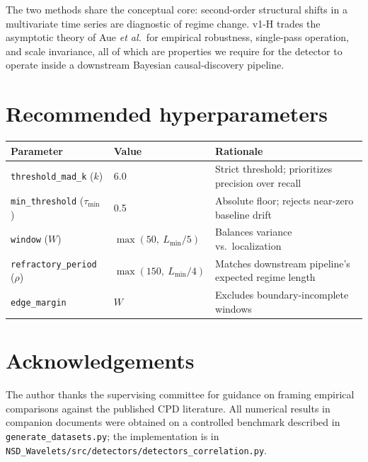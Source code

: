 \documentclass[11pt,a4paper]{article}
\begin{document}
The two methods share the conceptual core: second-order structural shifts
in a multivariate time series are diagnostic of regime change. v1-H trades
the asymptotic theory of Aue \emph{et al.}\ for empirical robustness, single-pass
operation, and scale invariance, all of which are properties we require
for the detector to operate inside a downstream Bayesian causal-discovery
pipeline.

\section{Recommended hyperparameters}

\begin{center}
\small
\begin{tabular}{lll}
\toprule
\textbf{Parameter} & \textbf{Value} & \textbf{Rationale} \\
\midrule
\texttt{threshold\_mad\_k} ($k$) & 6.0 & Strict threshold; prioritizes precision over recall \\
\texttt{min\_threshold} ($\tau_{\min}$) & 0.5 & Absolute floor; rejects near-zero baseline drift \\
\texttt{window} ($W$) & $\max(50,\ L_{\min}/5)$ & Balances variance vs.\ localization \\
\texttt{refractory\_period} ($\rho$) & $\max(150,\ L_{\min}/4)$ & Matches downstream pipeline's expected regime length \\
\texttt{edge\_margin} & $W$ & Excludes boundary-incomplete windows \\
\bottomrule
\end{tabular}
\end{center}

\section*{Acknowledgements}

The author thanks the supervising committee for guidance on framing
empirical comparisons against the published CPD literature. All numerical
results in companion documents were obtained on a controlled benchmark
described in \texttt{generate\_datasets.py}; the implementation is
in \texttt{NSD\_Wavelets/src/detectors/detectors\_correlation.py}.
\end{document}
